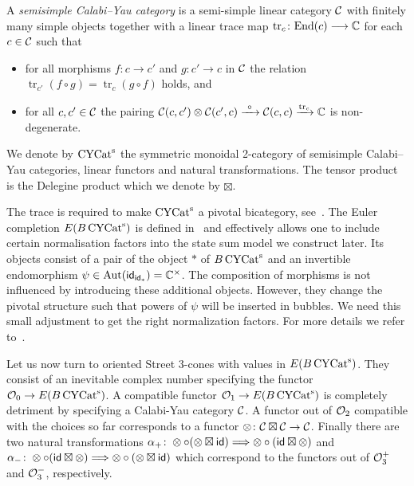 \begin{definition}
	A \emph{semisimple Calabi--Yau category} is a semi-simple linear category $\mathcal{C}$ with finitely many simple objects together with a linear
	trace map $\operatorname{tr}_c \colon \mathrm{End} (c) \longrightarrow \mathbb{C}$ for each $c\in \mathcal{C}$ such that
	\begin{itemize}
		\item
		for all morphisms $f\colon c \longrightarrow c'$ and $g\colon c' \longrightarrow c$ in $\mathcal{C}$ the relation $\operatorname{tr}_{c'}(f\circ g)= \operatorname{tr}_c({g\circ f})$ holds, and
		\item
		for all $c,c'\in \mathcal{C}$ the pairing $\mathcal{C}(c,c') \otimes \mathcal{C}(c',c) \xrightarrow{\  \circ  \ } \mathcal{C}(c,c) \xrightarrow{\operatorname{tr}_c} \mathbb{C}$ is non-degenerate.
	\end{itemize}
We denote by $\operatorname{\mathrm{CYCat}^s}$ the symmetric monoidal 2-category of semisimple Calabi--Yau categories, linear functors and natural transformations. The tensor product is the Delegine product which we denote by $\boxtimes$. 
\end{definition}
The trace is required to make $\operatorname{\mathrm{CYCat}^s}$ a pivotal bicategory, see~\cite[Proposition 5.6]{3DOrb}.  
The Euler completion $E(B\operatorname{\mathrm{CYCat}^s})$ is defined in~\cite[Section 5.1.3]{3DOrb} and effectively allows one to include certain normalisation factors into the state sum model we construct later. 
Its objects consist of a pair of the object $*$ of $B\operatorname{\mathrm{CYCat}^s}$ and an invertible endomorphism $\psi \in \operatorname{Aut} (\mathsf{id}_{\mathsf{id}_*})=\mathbb{C}^\times$. The composition of morphisms is not influenced by introducing these additional objects. However, they change the pivotal structure such that powers of $\psi$ will be inserted in bubbles. We need this small adjustment to get the right normalization factors. For more details we refer to~\cite[Section 5.1.3]{3DOrb}.  

Let us now turn to oriented Street 3-cones with values in $E(B\operatorname{\mathrm{CYCat}^s})$. They consist of an inevitable complex number specifying the functor $\mathcal{O}_0 \to E(B\operatorname{\mathrm{CYCat}^s})$. A compatible functor $\mathcal{O}_1 \to E(B\operatorname{\mathrm{CYCat}^s})$ is completely detriment by specifying a Calabi-Yau category $\mathcal{C}$. A functor out of $\mathcal{O}_2$ compatible with the choices so far corresponds to a functor $\otimes \colon \mathcal{C} \boxtimes \mathcal{C} \to \mathcal{C}$. Finally there are two natural transformations $\alpha_+\colon \otimes \circ (\otimes \boxtimes \mathsf{id} ) \Longrightarrow \otimes \circ (\mathsf{id} \boxtimes \otimes )$ and $\alpha_-\colon \otimes \circ (\mathsf{id} \boxtimes \otimes ) \Longrightarrow \otimes \circ (\otimes \boxtimes \mathsf{id} )$ which correspond to the functors out of $\mathcal{O}_3^+$ and $\mathcal{O}_3^-$, respectively.    

